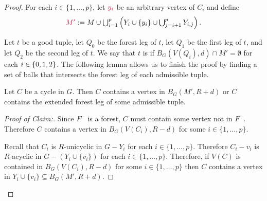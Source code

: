 \documentclass{patmorin}
\newcommand{\pat}[1]{\textcolor{Blue}{Pat: #1}}
\newenvironment{clmproof}{\begin{proof}[Proof of Claim:]\renewcommand{\qedsymbol}{\rule{1ex}{1ex}}}{\end{proof}}
\DeclarePairedDelimiter\set{\{}{\}}
\begin{document}
\begin{proof}


For each $i\in\{1,\ldots,p\}$, let $\mathdefin{y_i}$ be an arbitrary vertex of $C_i$ and define
\[
\textstyle \mathdefin{M'}:= M \cup \bigcup_{i=1}^p \left(Y_i\cup\{y_i\} \cup \bigcup_{j=i+1}^{p} Y_{i,j}\right).
\]

Let $t$ be a good tuple, let $Q_0$ be the forest leg of $t$, let $Q_1$ be the first leg of $t$, and let $Q_2$ be the second leg of $t$.
We say that $t$ is  if
$B_G(V(Q_i),d) \cap M' = \emptyset$ for each $i\in\set{0,1,2}$.   The following lemma allows us to finish the proof by finding a set of balls that intersects the forest leg of each admissible tuple.

\begin{clm}
  Let $C$ be a cycle in $G$.  Then  $C$ contains a vertex in $B_G(M',R+d)$ or $C$ contains the extended forest leg of some admissible tuple.
\end{clm}

\begin{clmproof}
  Since $F^-$ is a forest, $C$ must contain some vertex not in $F^-$.  Therefore $C$ contains a vertex in $B_G(V(C_i),R-d)$ for some $i\in\{1,\ldots,p\}$.

  Recall that $C_i$ is $R$-unicyclic in $G-Y_i$ for each $i\in\{1,\ldots,p\}$.  Therefore  $C_i-v_i$ is $R$-acyclic in $G-(Y_i\cup\{v_i\})$ for each $i\in\{1,\ldots,p\}$.  Therefore, if $V(C)$ is contained in $B_G(V(C_i),R-d)$ for some $i\in\{1,\ldots,p\}$ then $C$ contains a vertex in $Y_i\cup\{v_i\}\subseteq B_G(M',R+d)$.


\end{clmproof}
\end{proof}
\end{document}
